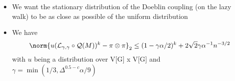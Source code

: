 \documentclass{beamer}
\begin{document}
\begin {frame}
\begin{itemize}


 \item We want the stationary distribution of the Doeblin coupling (on the lazy walk) to be as close as possible of the uniform distribution \pi \otimes \pi

\item We have \[
  \norm{u(\mathcal L_{\gamma,\gamma} \circ \mathcal Q(M))^k - \pi \otimes \pi}_2 \leq (1 - \gamma \alpha / 2)^k + 2 \sqrt 2 \gamma \alpha^{-1} n^{-3/2}
\] with $u$ being a distribution over V[G] x V[G] and $\gamma = \min(1/3, \Delta^{0.5-c}\alpha/9)$





\end{itemize}
\end {frame}
\end{document}
